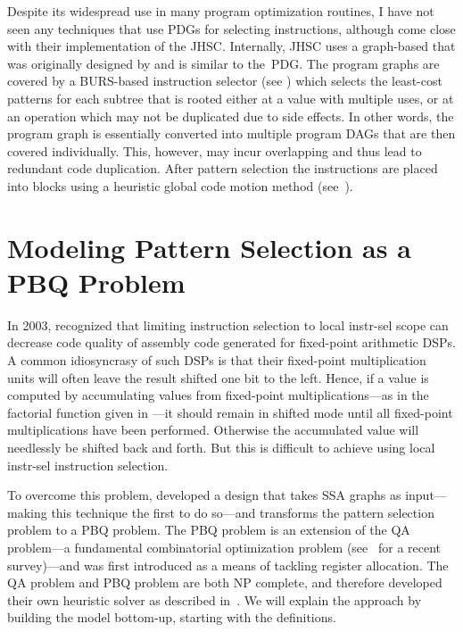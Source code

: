 Despite its widespread use in many \gls{program} optimization routines, I have
not seen any techniques that use \glspl{PDG} for selecting \glspl{instruction},
although \textcite{Paleczny2001} come close with their implementation of the
\gls{JHSC}.
%
Internally, \gls{JHSC} uses a \gls{graph}-based \tIRformat that was
originally designed by \textcite{Click1995a} and is similar to
the~\gls{PDG}.
%
The \glspl{program graph} are covered by a \gls{BURS}-based
\gls{instruction selector} (see )
which selects the least-cost \glspl{pattern} for each \gls{subtree} that is
rooted either at a value with multiple uses, or at an operation which may not be
duplicated due to \glspl{side effect}.
%
In other words, the \gls{program graph}
is essentially converted into multiple \glspl{program DAG} that are then covered
individually.
%
This, however, may incur overlapping and thus lead to redundant
code duplication.
%
After \gls{pattern selection} the \glspl{instruction} are
placed into \glspl{block} using a heuristic \gls{global code motion} method
(see~\cite{Click1995b}).


\section{Modeling Pattern Selection as a PBQ Problem}

In 2003, \textcite{Eckstein2003} recognized that limiting \gls{instruction
  selection} to \gls{local instr-sel} scope can decrease code quality of
\gls{assembly code} generated for fixed-point arithmetic \glsdesc{DSP}s.
%
A
common idiosyncrasy of such \glspl{DSP} is that their fixed-point multiplication
units will often leave the result shifted one bit to the left.
%
Hence, if a value
is computed by accumulating values from fixed-point multiplications---as in the
factorial \gls{function} given in \unskip%
---it should remain in shifted mode until all fixed-point multiplications have
been performed.
%
Otherwise the accumulated value will needlessly be shifted back
and forth.
%
But this is difficult to achieve using \gls{local instr-sel}
\gls{instruction selection}.

To overcome this problem, \citeauthor{Eckstein2003} developed a design that
takes \glspl{SSA graph} as input---making this technique the first to do
so---and transforms the \gls{pattern selection} problem to a \gls{PBQ
  problem}.
%
The \gls{PBQ problem} is an extension of the \gls{QA problem}---a
fundamental combinatorial optimization problem (see~\cite{Loiola2007} for a
recent survey)---and was first introduced \textcite{Scholz2002} as a means of
tackling \gls{register allocation}.
%
The \gls{QA problem} and \gls{PBQ problem}
are both \gls{NP complete}, and \citeauthor{Eckstein2003} therefore developed
their own heuristic solver as described in~\cite{Eckstein2003}.
%
We will explain
the  approach by building the model bottom-up, starting
with the definitions.

